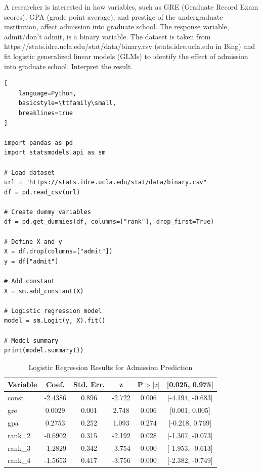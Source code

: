 \documentclass[12pt,a4paper]{report}
\begin{document}
A researcher is interested in how variables, such as GRE (Graduate Record Exam scores), GPA (grade point average), and prestige of the undergraduate institution, affect admission into graduate school. The response variable, admit/don’t admit, is a binary variable. The dataset is taken from https://stats.idre.ucla.edu/stat/data/binary.csv (stats.idre.ucla.edu in Bing) and fit logistic generalized linear models (GLMs) to identify the effect of admission into graduate school. Interpret the result.
\begin{tcolorbox}[
    enhanced,
    colback=blue!3,
    colframe=blue!70!black,
    title=Binary Logistic Regression Model,
    fonttitle=\bfseries,
    coltitle=white,
    colbacktitle=blue!70!black,
    arc=4pt,
    boxrule=1pt,
    breakable
]

\begin{lstlisting}[
    language=Python,
    basicstyle=\ttfamily\small,
    breaklines=true
]

import pandas as pd
import statsmodels.api as sm

# Load dataset
url = "https://stats.idre.ucla.edu/stat/data/binary.csv"
df = pd.read_csv(url)

# Create dummy variables
df = pd.get_dummies(df, columns=["rank"], drop_first=True)

# Define X and y
X = df.drop(columns=["admit"])
y = df["admit"]

# Add constant
X = sm.add_constant(X)

# Logistic regression model
model = sm.Logit(y, X).fit()

# Model summary
print(model.summary())

\end{lstlisting}

\end{tcolorbox}
\clearpage
\begin{table}[h!]
\centering
\begin{tabular}{|l|c|c|c|c|c|}
\hline
\textbf{Variable} & \textbf{Coef.} & \textbf{Std. Err.} & \textbf{z} & \textbf{P$>|z|$} & \textbf{[0.025, 0.975]} \\ \hline
const   & -2.4386 & 0.896 & -2.722 & 0.006 & [-4.194, -0.683] \\ \hline
gre     & 0.0029  & 0.001 & 2.748  & 0.006 & [0.001, 0.005]   \\ \hline
gpa     & 0.2753  & 0.252 & 1.093  & 0.274 & [-0.218, 0.769]  \\ \hline
rank\_2 & -0.6902 & 0.315 & -2.192 & 0.028 & [-1.307, -0.073] \\ \hline
rank\_3 & -1.2829 & 0.342 & -3.754 & 0.000 & [-1.953, -0.613] \\ \hline
rank\_4 & -1.5653 & 0.417 & -3.756 & 0.000 & [-2.382, -0.749] \\ \hline
\end{tabular}
\caption{Logistic Regression Results for Admission Prediction}
\label{tab:logit_results}
\end{table}
\end{document}
